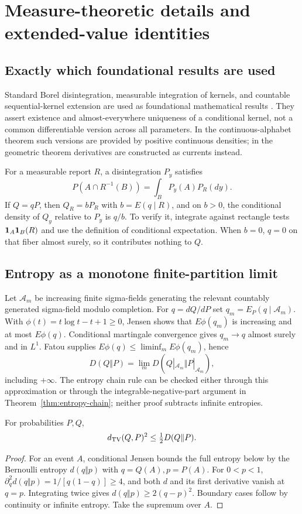 \section{Measure-theoretic details and extended-value identities}\label{app:measure}
\subsection{Exactly which foundational results are used}
Standard Borel disintegration, measurable integration of kernels, and countable sequential-kernel extension are used as foundational mathematical results \cite{Kallenberg}. They assert existence and almost-everywhere uniqueness of a conditional kernel, not a common differentiable version across all parameters. In the continuous-alphabet theorem such versions are provided by positive continuous densities; in the geometric theorem derivatives are constructed as currents instead.

For a measurable report $R$, a disintegration $P_y$ satisfies
\[
 P(A\cap R^{-1}(B))=\int_B P_y(A)P_R(dy).
\]
If $Q=qP$, then $Q_R=bP_R$ with $b=E(q\mid R)$, and on $b>0$, the conditional density of $Q_y$ relative to $P_y$ is $q/b$. To verify it, integrate against rectangle tests $\mathbf 1_A\mathbf 1_B(R)$ and use the definition of conditional expectation. When $b=0$, $q=0$ on that fiber almost surely, so it contributes nothing to $Q$.

\subsection{Entropy as a monotone finite-partition limit}
Let $\mathcal A_m$ be increasing finite sigma-fields generating the relevant countably generated sigma-field modulo completion. For $q=dQ/dP$ set $q_m=E_P(q\mid\mathcal A_m)$. With $\phi(t)=t\log t-t+1\ge0$, Jensen shows that $E\phi(q_m)$ is increasing and at most $E\phi(q)$. Conditional martingale convergence gives $q_m\to q$ almost surely and in $L^1$. Fatou supplies
$E\phi(q)\le\liminf_mE\phi(q_m)$, hence
\[
 D(Q\Vert P)=\lim_mD(Q|_{\mathcal A_m}\Vert P|_{\mathcal A_m}),
\]
including $+\infty$. The entropy chain rule can be checked either through this approximation or through the integrable-negative-part argument in Theorem~\ref{thm:entropy-chain}; neither proof subtracts infinite entropies.

\begin{lemma}\label{lem:pinsker}
For probabilities $P,Q$,
\[
 d_{\operatorname{TV}}(Q,P)^2\le\tfrac12D(Q\Vert P).
\]
\end{lemma}
\begin{proof}
For an event $A$, conditional Jensen bounds the full entropy below by the Bernoulli entropy $d(q\Vert p)$ with $q=Q(A),p=P(A)$. For $0<p<1$,
$\partial_q^2d(q\Vert p)=1/[q(1-q)]\ge4$, and both $d$ and its first derivative vanish at $q=p$. Integrating twice gives $d(q\Vert p)\ge2(q-p)^2$. Boundary cases follow by continuity or infinite entropy. Take the supremum over $A$.
\end{proof}

